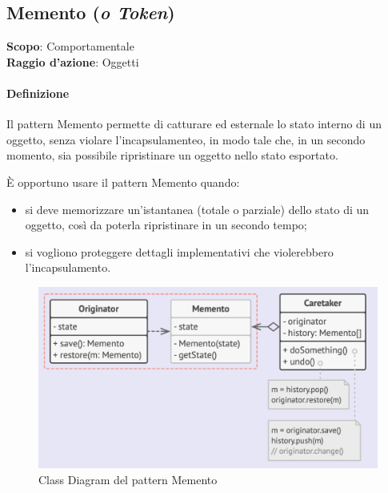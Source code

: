 \subsection{Memento (\textit{o Token})}
\label{memento}

\textbf{Scopo}: Comportamentale \\
\textbf{Raggio d'azione}: Oggetti

\paragraph{Definizione} Il pattern Memento permette di catturare ed esternale lo stato interno di un oggetto, senza violare l'incapsulamenteo, in modo tale che, in un secondo momento, sia possibile ripristinare un oggetto nello stato esportato.

È opportuno usare il pattern Memento quando:
\begin{itemize}
    \item si deve memorizzare un'istantanea (totale o parziale) dello stato di un oggetto, così da poterla ripristinare in un secondo tempo;
    \item si vogliono proteggere dettagli implementativi che violerebbero l'incapsulamento.
\end{itemize}

\begin{figure}[H]
    \centering
    \includegraphics[width=1\linewidth]{assets/pattern/memento/memento-struttura.png}
    \caption{Class Diagram del pattern Memento}
\end{figure}

